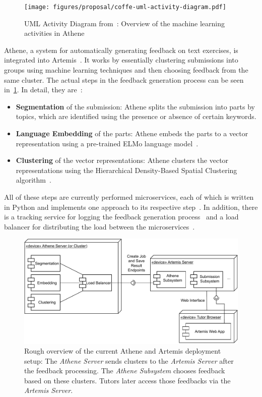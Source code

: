 \begin{figure}[ht]
    \centering
    \texttt{[image: figures/proposal/coffe-uml-activity-diagram.pdf]}
    \caption{UML Activity Diagram from~\cite{cofee}: Overview of the machine learning activities in Athene}
    \label{fig:coffeeUmlActivityDiagram}
\end{figure}

Athene, a system for automatically generating feedback on text exercises, is integrated into Artemis~\cite{cofee}. It works by essentially clustering submissions into groups using machine learning techniques and then choosing feedback from the same cluster. The actual steps in the feedback generation process can be seen in~\cref{fig:coffeeUmlActivityDiagram}. In detail, they are~\cite{cofee}:
\begin{itemize}
    \item \textbf{Segmentation} of the submission: Athene splits the submission into parts by topics, which are identified using the presence or absence of certain keywords.
    \item \textbf{Language Embedding} of the parts: Athene embeds the parts to a vector representation using a pre-trained ELMo language model~\cite{deepContextualizedWordRepresentations}.
    \item \textbf{Clustering} of the vector representations: Athene clusters the vector representations using the Hierarchical Density-Based Spatial Clustering algorithm~\cite{hdbsc}.
\end{itemize}

All of these steps are currently performed microservices, each of which is written in Python and implements one approach to its respective step~\cite{cofee}.
In addition, there is a tracking service for logging the feedback generation process~\cite{atheneTracking} and a load balancer for distributing the load between the microservices~\cite{atheneLoadBalancer}.

\begin{figure}[ht]
    \centering
    \includegraphics[width=0.8\linewidth]{figures/proposal/deployment-diagram.pdf}
    \caption{Rough overview of the current Athene and Artemis deployment setup: The \textit{Athene Server} sends clusters to the \textit{Artemis Server} after the feedback processing. The \textit{Athene Subsystem} chooses feedback based on these clusters. Tutors later access those feedbacks via the \textit{Artemis Server}.}
    \label{fig:atheneArtemisDeployment}
\end{figure}

